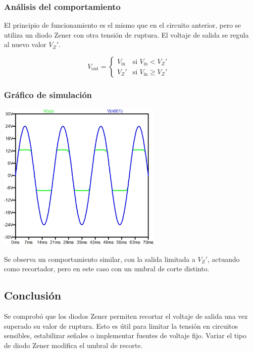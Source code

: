 \documentclass[chaptersright]{informeutn}
\begin{document}
\subsubsection*{Análisis del comportamiento}

El principio de funcionamiento es el mismo que en el circuito anterior, pero se utiliza un diodo Zener con otra tensión de ruptura. El voltaje de salida se regula al nuevo valor \( V_Z' \).

\[
V_{\text{out}} =
\begin{cases}
    V_{\text{in}} & \text{si } V_{\text{in}} < V_Z' \\
    V_Z' & \text{si } V_{\text{in}} \geq V_Z'
\end{cases}
\]

\subsubsection*{Gráfico de simulación}
\begin{center}
    \includegraphics[width=0.6\textwidth]{pictures/zener_2_grafico.jpeg}
\end{center}

\noindent
Se observa un comportamiento similar, con la salida limitada a \( V_Z' \), actuando como recortador, pero en este caso con un umbral de corte distinto.

\subsection*{Conclusión}

Se comprobó que los diodos Zener permiten recortar el voltaje de salida una vez superado su valor de ruptura. Esto es útil para limitar la tensión en circuitos sensibles, estabilizar señales o implementar fuentes de voltaje fijo. Variar el tipo de diodo Zener modifica el umbral de recorte.
\end{document}
